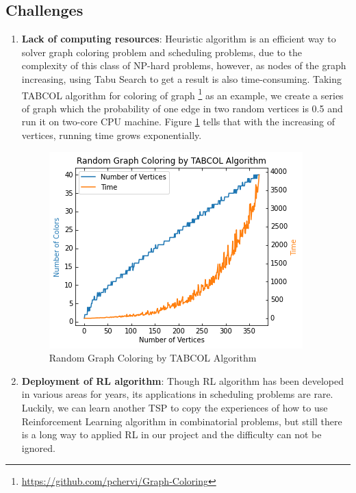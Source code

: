\documentclass{article}
\begin{document}
\subsection{Challenges}
\begin{enumerate}
	\item \textbf{Lack of computing resources}: Heuristic algorithm is an efficient way to solver graph coloring problem and scheduling problems, due to the complexity of this class of NP-hard problems, however, as nodes of the graph increasing, using Tabu Search to get a result is also time-consuming. Taking TABCOL algorithm for coloring of graph \footnote{\url{https://github.com/pchervi/Graph-Coloring}} as an example, we create a series of graph which the probability of one edge in two random vertices is 0.5 and run it on two-core CPU machine. Figure \ref{fig4} tells that with the increasing of vertices, running time grows exponentially.
	
	\begin{figure}[htbp]
		\centering
		\includegraphics[width=0.6\linewidth]{fig4.png}
		\caption{Random Graph Coloring by TABCOL Algorithm}\label{fig4}
	\end{figure}
	\item \textbf{Deployment of RL algorithm}: Though RL algorithm has been developed in various areas for years, its applications in scheduling problems are rare. Luckily, we can learn another TSP to copy the experiences of how to use Reinforcement Learning algorithm in combinatorial problems, but still there is a long way to applied RL in our project and the difficulty can not be ignored.
\end{enumerate}
\newpage
\qquad

\newpage



\end{document}
